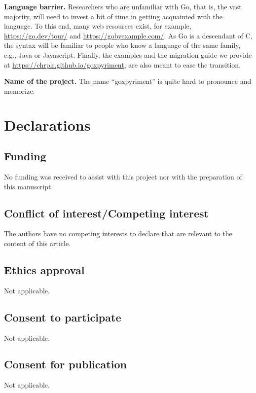 \documentclass[man,a4paper]{apa7}
\begin{document}
\textbf{Language barrier.}  Researchers who are unfamiliar with Go,
that is, the vast majority, will need to invest a bit of time in
getting acquainted with the language.  To this end, many web resources
exist, for example, \url{https://go.dev/tour/} and
\url{https://gobyexample.com/}. As Go is a descendant of C, the syntax
will be familiar to people who know a language of the same family,
e.g., Java or Javascript. Finally, the examples and the migration guide
we provide at \url{https://chrplr.github.io/goxpyriment}, are also
meant to ease the transition.

\textbf{Name of the project.} The name ``goxpyriment'' is quite hard to
pronounce and memorize.

\clearpage

\section{Declarations}

\subsection{Funding}

No funding was received to assist with this project nor with the preparation of this manuscript.

\subsection{Conflict of interest/Competing interest}

The authors have no competing interests to declare that are relevant to the content of this article.

\subsection{Ethics approval}

Not applicable.

\subsection{Consent to participate}

Not applicable.

\subsection{Consent for publication}

Not applicable.
\end{document}

